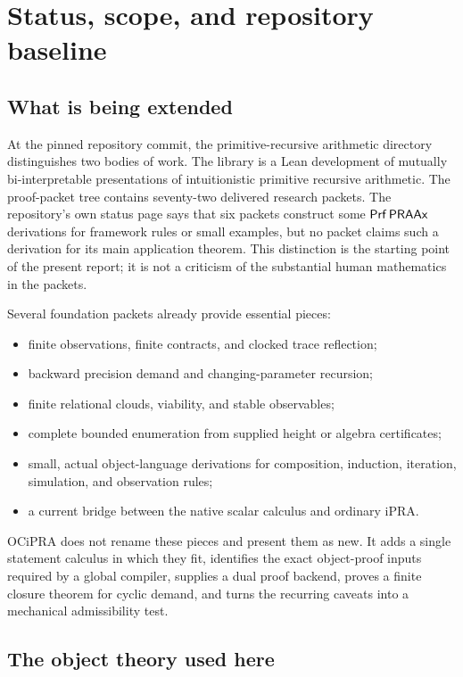 \section{Status, scope, and repository baseline}

\subsection{What is being extended}

At the pinned repository commit, the primitive-recursive arithmetic directory distinguishes two bodies of work.  The  library is a Lean development of mutually bi-interpretable presentations of intuitionistic primitive recursive arithmetic.  The proof-packet tree contains seventy-two delivered research packets.  The repository's own status page says that six packets construct some \(\mathsf{Prf}\,\mathsf{PRAAx}\) derivations for framework rules or small examples, but no packet claims such a derivation for its main application theorem.  This distinction is the starting point of the present report; it is not a criticism of the substantial human mathematics in the packets.

Several foundation packets already provide essential pieces:

\begin{itemize}
  \item finite observations, finite contracts, and clocked trace reflection;
  \item backward precision demand and changing-parameter recursion;
  \item finite relational clouds, viability, and stable observables;
  \item complete bounded enumeration from supplied height or algebra certificates;
  \item small, actual object-language derivations for composition, induction, iteration, simulation, and observation rules;
  \item a current bridge between the native scalar calculus and ordinary iPRA.
\end{itemize}

OCiPRA does not rename these pieces and present them as new.  It adds a single statement calculus in which they fit, identifies the exact object-proof inputs required by a global compiler, supplies a dual proof backend, proves a finite closure theorem for cyclic demand, and turns the recurring caveats into a mechanical admissibility test.

\subsection{The object theory used here}

